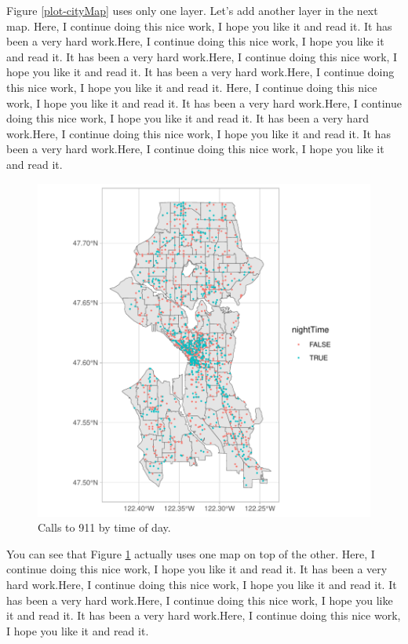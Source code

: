 \documentclass[a4paper, 12pt]{article}
\begin{document}
Figure \ref{plot-cityMap} uses only one layer. Let's add another layer in the next map. Here, I continue doing this nice work, I hope you like it and read it. It has been a very hard work.Here, I continue doing this nice work, I hope you like it and read it. It has been a very hard work.Here, I continue doing this nice work, I hope you like it and read it. It has been a very hard work.Here, I continue doing this nice work, I hope you like it and read it.  Here, I continue doing this nice work, I hope you like it and read it. It has been a very hard work.Here, I continue doing this nice work, I hope you like it and read it. It has been a very hard work.Here, I continue doing this nice work, I hope you like it and read it. It has been a very hard work.Here, I continue doing this nice work, I hope you like it and read it.


\begin{figure}[h]
\centering
\begin{adjustbox}{width=10cm,height=10cm} 
\includegraphics{WorkInR_forPrinter-plot-911Map}
\end{adjustbox}
\caption{Calls to 911 by time of day.}  
\label{plot-911Map} 
\end{figure}

You can see that Figure \ref{plot-911Map} actually uses one map on top of the other. 
Here, I continue doing this nice work, I hope you like it and read it. It has been a very hard work.Here, I continue doing this nice work, I hope you like it and read it. It has been a very hard work.Here, I continue doing this nice work, I hope you like it and read it. It has been a very hard work.Here, I continue doing this nice work, I hope you like it and read it. 
\end{document}
